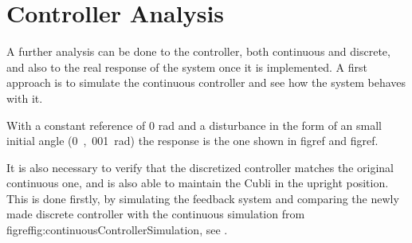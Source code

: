 
\section{Controller Analysis}\label{ssec:ControllerVerification}
A further analysis can be done to the controller, both continuous and discrete, and also to the real response of the system once it is implemented.
A first approach is to simulate the continuous controller and see how the system behaves with it.

With a constant reference of 0 rad and a disturbance in the form of an small initial angle (\si{0,001 rad}) the response is the one shown in figref{} and figref{}.


It is also necessary to verify that the discretized controller matches the original continuous one, and is also able to maintain the Cubli in the upright position. This is done firstly, by simulating the feedback system and comparing the newly made discrete controller with the continuous simulation from figref{fig:continuousControllerSimulation}, see .
%

